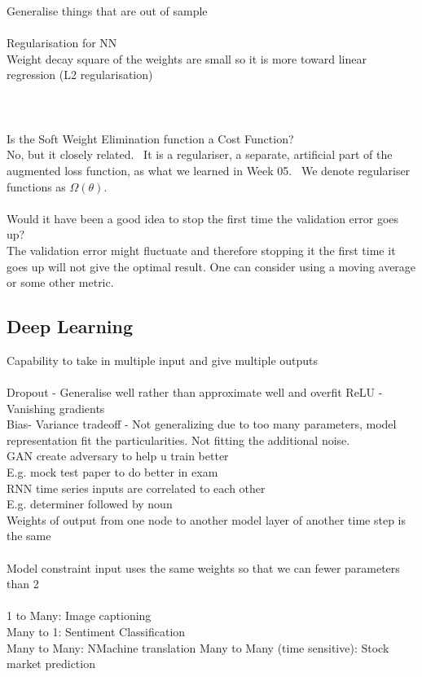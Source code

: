 \documentclass[11pt]{article}
\begin{document}
Generalise things that are out of sample\\
\\
Regularisation for NN\\
Weight decay square of the weights are small so it is more toward linear regression (L2 regularisation) \\
\\
\\
\\
Is the Soft Weight Elimination function a Cost Function?\\
No, but it closely related.  It is a regulariser, a separate, artificial part of the augmented loss function, as what we learned in Week 05.  We denote regulariser functions as $\Omega(\theta)$.
\\\\
Would it have been a good idea to stop the first time the validation error goes up?\\
The validation error might fluctuate and therefore stopping it the first time it goes up will not give the optimal result. One can consider using a moving average or some other metric.\\
\subsection*{Deep Learning}
Capability to take in multiple input and give multiple outputs\\\\
Dropout - Generalise well rather than approximate well and overfit
ReLU - Vanishing gradients
\\
Bias- Variance tradeoff - Not generalizing due to too many parameters, model representation fit the particularities. Not fitting the additional noise.
\\
GAN create adversary to help u train better\\
E.g. mock test paper to do better in exam
\\
RNN time series inputs are correlated to each other\\
E.g. determiner followed by noun
\\
Weights of output from one node to another model layer of another time step is the same \\
\\
Model constraint input uses the same weights so that we can fewer parameters than 2
\\
\\
1 to Many: Image captioning\\
Many to 1: Sentiment Classification\\
Many to Many: NMachine translation
Many to Many (time sensitive): Stock market prediction\\
\\
\end{document}
